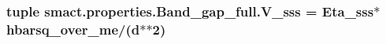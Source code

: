 \subsubsection[{V\+\_\+sss}]{\setlength{\rightskip}{0pt plus 5cm}tuple smact.\+properties.\+Band\+\_\+gap\+\_\+full.\+V\+\_\+sss = {\bf Eta\+\_\+sss}$\ast${\bf hbarsq\+\_\+over\+\_\+me}/({\bf d}$\ast$$\ast$2)}\label{namespacesmact_1_1properties_1_1_band__gap__full_a69ae1b4a5da471226913ce16b15392f3}
